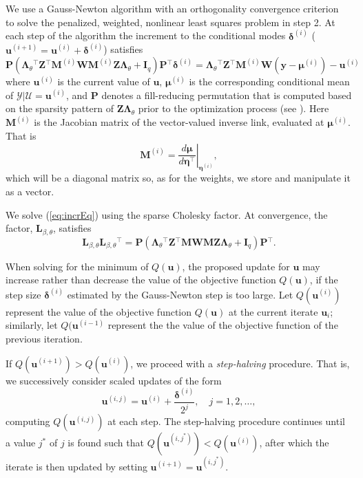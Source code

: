 \documentclass{article}
\newcommand{\bLt}{\ensuremath{\bm\Lambda_\theta}}
\newcommand{\mc}[1]{\ensuremath{\mathcal{#1}}}
\newcommand{\trans}{\ensuremath{^\top}}
\begin{document}
We use a Gauss-Newton algorithm with an orthogonality convergence
criterion~\citep[\S 2.2.3]{bateswatts88:_nonlin} to solve the
penalized, weighted, nonlinear least squares problem in step 2.
At each step of the algorithm the increment to the conditional modes
$\bm\delta^{(i)}$ 
($\bm u^{(i+1)} = \bm u^{(i)} + \bm\delta^{(i)}$)
satisfies
\begin{equation}
  \label{eq:incrEq}
  \bm P\left(\bLt\trans\bm Z\trans\bm M^{(i)}\bm W\bm M^{(i)}\bm Z\bLt+\bm I_q\right)\bm P\trans
      \bm\delta^{(i)}=\bLt\trans\bm Z\trans\bm M^{(i)}\bm W(\bm y-\bm\mu^{(i)}) - \bm u^{(i)}
\end{equation}
where $\bm u^{(i)}$ is the current value of $\bm u$, $\bm\mu^{(i)}$ is the
corresponding conditional mean of $\mc Y|\mc U=\bm u^{(i)}$,
and $\bm P$ denotes a fill-reducing permutation that is computed based on the sparsity pattern
of $\bm Z \bm \Lambda_{\theta}$ prior to the optimization process (see \cite{bates2015fitting}).
Here $\bm M^{(i)}$ is
the Jacobian matrix of the vector-valued inverse link, evaluated at
$\bm\mu^{(i)}$.  That is
\begin{equation}
  \label{eq:Jacobian}
  \bm M^{(i)}=\left.\frac{d\bm\mu}{d\bm\eta\trans}\right|_{\bm\eta^{(i)}},
\end{equation}
which will be a diagonal matrix so, as for the weights, we store and
manipulate it as a vector.

We solve (\ref{eq:incrEq}) using the sparse Cholesky factor.  At convergence, the factor, $\bm L_{\beta,\theta}$, satisfies
\begin{equation}
  \label{eq:CholFactorGLMM}
  \bm L_{\beta,\theta}\bm L_{\beta,\theta}\trans =
  \bm P\left(\bLt\trans\bm Z\trans\bm M\bm W\bm M\bm Z\bLt+\bm I_q\right)\bm P\trans.
\end{equation}

When solving for the minimum of $Q(\bm u)$, the proposed update
for $\bm u$ may increase rather than decrease the value of the objective 
function $Q(\bm u)$, if the step size $\bm \delta^{(i)}$ estimated by the Gauss-Newton step
is too large. Let $Q(\bm u^{(i)})$ represent the value of the objective 
function $Q(\bm u)$ at the current iterate $\bm u_{i}$; similarly, let 
$Q(\bm u^{(i-1)}$ represent the the value of the objective function of the 
previous iteration. 

If $Q(\bm u^{(i+1)}) > Q(\bm u^{(i)})$, we proceed with a \emph{step-halving}
  procedure. That is, we successively consider scaled updates of the form
  \begin{equation}
  \bm u^{(i,j)} = \bm u^{(i)} + \frac{\bm \delta^{(i)}}{2^j}, \quad j = 1, 2, \ldots,
\end{equation}
computing $Q(\bm u^{(i,j)})$ at each step. The step-halving procedure 
continues until a value $j^*$ of $j$ is found such that 
$Q(\bm u^{(i,j^*)}) < Q(\bm u^{(i)})$,
after which the iterate is then updated by setting $\bm u^{(i+1)} = \bm u^{(i,j^*)}$.
\end{document}
